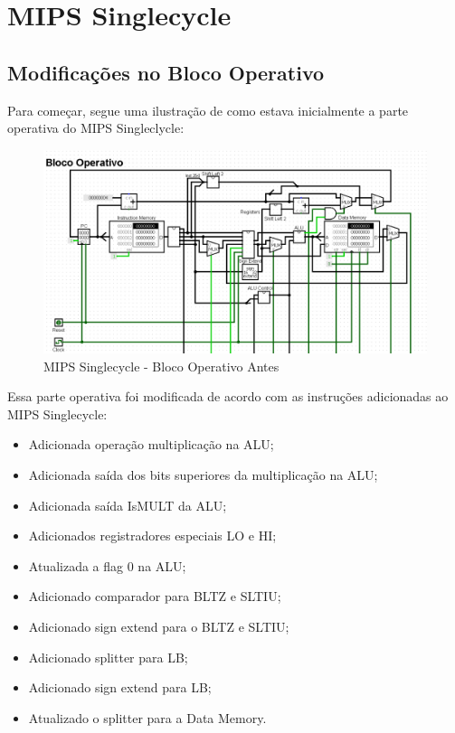 \documentclass{report}
\let\oldsection\section
\renewcommand\section{\clearpage\oldsection}
\begin{document}
    \renewcommand{\contentsname}{Sumário}
    \tableofcontents
    \clearpage

    \section{MIPS Singlecycle}
        \subsection{Modificações no Bloco Operativo}
        Para começar, segue uma ilustração de como estava inicialmente a parte operativa do MIPS Singleclycle:
        \begin{figure}[h!]
            \centering
            \includegraphics[width=\linewidth]{images/prints/Monocycle/Bloco Operativo Monocycle Antes.png}
            \caption{\label{print:singlecycle_ob_before} MIPS Singlecycle - Bloco Operativo Antes}
        \end{figure}

        Essa parte operativa foi modificada de acordo com as instruções adicionadas ao MIPS Singlecycle:
        \begin{itemize}
            \item Adicionada operação multiplicação na ALU;
            \item Adicionada saída dos bits superiores da multiplicação na ALU;
            \item Adicionada saída IsMULT da ALU;
            \item Adicionados registradores especiais LO e HI;
            \item Atualizada a flag 0 na ALU;
            \item Adicionado comparador para BLTZ e SLTIU;
            \item Adicionado sign extend para o BLTZ e SLTIU;
            \item Adicionado splitter para LB;
            \item Adicionado sign extend para LB;
            \item Atualizado o splitter para a Data Memory.
        \end{itemize}
\end{document}

